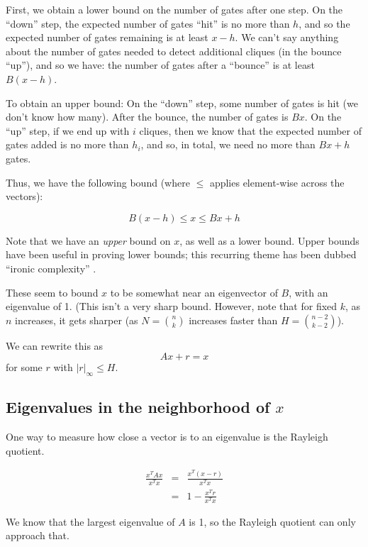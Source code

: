 \documentclass[12pt]{article}
\theoremstyle{definition}
\begin{document}
First, we obtain a lower bound on the number of gates after one step.
On the ``down'' step, the expected number of gates ``hit'' is no more than $h$,
and so the expected number of gates remaining is at least $x - h$.
We can't say anything about the number of gates needed to detect additional cliques (in the bounce ``up''), and so we have:
the number of gates after a ``bounce'' is at least $B(x-h)$.

To obtain an upper bound: On the ``down'' step, some number of gates is hit (we don't know how many).
After the bounce, the number of gates is $Bx$.
On the ``up'' step,
if we end up with $i$ cliques, then we know that the expected number of gates added is no more than $h_i$,
and so, in total, we need no more than $Bx+h$ gates.

Thus, we have the following bound (where $\le$ applies element-wise across the vectors):

\begin{equation}
\label{eq:stepBound}
B(x - h) \le x \le Bx + h
\end{equation}

Note that we have an {\em upper} bound on $x$, as well
as a lower bound. Upper bounds have been useful in proving lower bounds;
this recurring theme has been dubbed ``ironic complexity''
\cite{aaronson_pnp}.

These seem to bound $x$ to be somewhat near an eigenvector of $B$, with an eigenvalue of 1.
(This isn't a very sharp bound.
However, note that for fixed $k$, as $n$ increases, it gets sharper (as $N = {n \choose k}$ increases faster than $H = {{n-2} \choose {k-2}}$).

We can rewrite this as
\[
Ax + r = x
\]
for some $r$ with $|r|_\infty \le H$.


\subsection{Eigenvalues in the neighborhood of $x$}

One way to measure how close a vector is to an eigenvalue is the Rayleigh quotient.

\begin{eqnarray*}
\frac{x^TAx}{x^Tx} & = & \frac{x^T(x - r)}{x^Tx} \\
& = & 1 - \frac{x^Tr}{x^Tx}
\end{eqnarray*}

We know that the largest eigenvalue of $A$ is 1, so the Rayleigh quotient can only
approach that.
\end{document}
